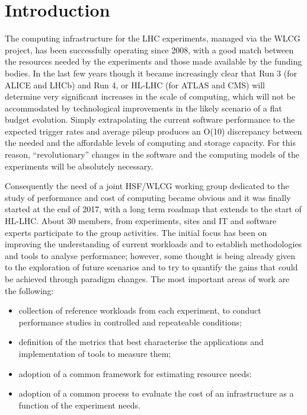 \section{Introduction}
The computing infrastructure for the LHC experiments, managed via the
WLCG project, has been successfully operating since 2008, with a good
match between the resources needed by the experiments and those made
available by the funding bodies. In the last few years though it
became increasingly clear that Run 3 (for ALICE and LHCb) and Run 4,
or HL-LHC (for ATLAS and CMS) will determine very significant
increases in the scale of computing, which will not be accommodated by
technological improvements in the likely scenario of a flat budget
evolution. Simply extrapolating the current software performance to
the expected trigger rates and average pileup produces an O(10)
discrepancy between the needed and the affordable levels of computing
and storage capacity. For this reason, ``revolutionary'' changes in
the software and the computing models of the experiments will be
absolutely necessary.

Consequently the need of a joint HSF/WLCG working group dedicated to
the study of performance and cost of computing became obvious and it
was finally started at the end of 2017, with a long term roadmap that
extends to the start of HL-LHC. About 30 members, from experiments,
sites and IT and software experts participate to the group
activities. The initial focus has been on improving the understanding
of current workloads and to establish methodologies and tools to
analyse performance; however, some thought is being already given to
the exploration of future scenarios and to try to quantify the gains
that could be achieved through paradigm changes. The most important
areas of work are the following:
\begin{itemize}
\item collection of reference workloads from each experiment, to conduct
  performance studies in controlled and repeateable conditions;
\item definition of the metrics that best characterise the applications and implementation of tools to measure them;
\item adoption of a common framework for estimating resource needs:
\item adoption of a common process to evaluate the cost of an infrastructure
  as a function of the experiment needs.
\end{itemize}

